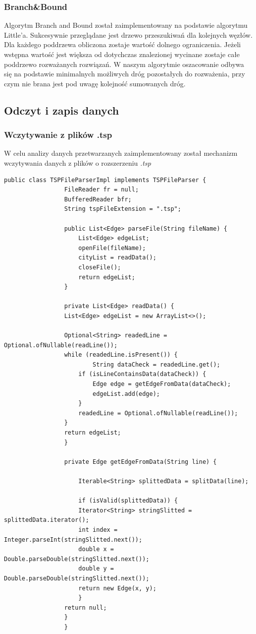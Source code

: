 \documentclass{article}
\begin{document}
		\subsubsection{Branch\&Bound}
			Algorytm Branch and Bound został zaimplementowany na podstawie algorytmu Little'a. Sukcesywnie przeglądane jest drzewo przeszukiwań dla kolejnych węzłów. Dla każdego poddrzewa obliczona zostaje wartość dolnego ograniczenia. Jeżeli wstępna wartość jest większa od dotychczas znalezionej wycinane zostaje całe poddrzewo rozważanych rozwiązań. W naszym algorytmie oszacowanie odbywa się na podstawie minimalnych możliwych dróg pozostałych do rozważenia, przy czym nie brana jest pod uwagę kolejność sumowanych dróg. 
	\subsection{Odczyt i zapis danych}
		\subsubsection{Wczytywanie z plików .tsp}
			W celu analizy danych przetwarzanych zaimplementowany został mechanizm wczytywania danych z plików o rozszerzeniu {\it .tsp}
			
				\begin{lstlisting}[xleftmargin=-150pt]
				public class TSPFileParserImpl implements TSPFileParser {
				 FileReader fr = null;
				 BufferedReader bfr;
				 String tspFileExtension = ".tsp";
				 
				 public List<Edge> parseFile(String fileName) {
					 List<Edge> edgeList;
					 openFile(fileName);
					 cityList = readData();
					 closeFile();
					 return edgeList;
				 }
				 
				 private List<Edge> readData() {
				 List<Edge> edgeList = new ArrayList<>();
				 
				 Optional<String> readedLine = Optional.ofNullable(readLine());
				 while (readedLine.isPresent()) {
						 String dataCheck = readedLine.get();
					 if (isLineContainsData(dataCheck)) {
						 Edge edge = getEdgeFromData(dataCheck);
						 edgeList.add(edge);
					 }
					 readedLine = Optional.ofNullable(readLine());
				 }
				 return edgeList;
				 }
				 					 
				 private Edge getEdgeFromData(String line) {
				 
					 Iterable<String> splittedData = splitData(line);
					 
					 if (isValid(splittedData)) {
					 Iterator<String> stringSlitted = splittedData.iterator();
					 int index = Integer.parseInt(stringSlitted.next());
					 double x = Double.parseDouble(stringSlitted.next());
					 double y = Double.parseDouble(stringSlitted.next());
					 return new Edge(x, y);
					 }
				 return null;
				 }
				 }
				\end{lstlisting}
		
\end{document}
